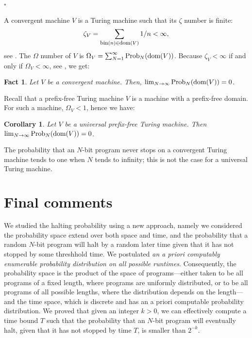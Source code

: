 \documentclass[12pt,twoside,openright]{report}
\newcommand{\QED}{\hfill $\square$}
\newcommand{\dom}{\mbox{\rm dom}}
\newcommand{\fdom}{\mbox{\rm \footnotesize{dom}}}
\newcommand{\fbin}{\mbox{\rm \footnotesize{bin}}}
\newcommand{\Prob}{{\rm Prob}}
\newtheorem{fact}[thm]{Fact}
\newtheorem{cor}[thm]{Corollary}
\begin{document}
\QED

\medskip

A convergent machine $V$ is a Turing machine such that its $\zeta$ number is finite:
$$\zeta_{V} = \sum_{\fbin (n) \in \fdom (V)} 1/n <\infty,$$ see \cite{CSNatural2006}. The $\Omega$ number of $V$ is $\Omega_{V} =\sum_{N=1}^{\infty} \Prob_{N}(\dom (V))$. Because $\zeta_{V} < \infty $ if and only if $\Omega_{V} < \infty$, see \cite{CSNatural2006}, we get:

\medskip

\begin{fact} 
Let $V$ be a convergent machine. Then, $\lim_{N \rightarrow \infty} \Prob_{N}(\dom (V)) =0$. 
\end{fact}

\medskip

Recall that a prefix-free  Turing machine  $V$ is a machine with a prefix-free domain. For such a machine, $\Omega_{V} < 1$, hence we have:

\medskip

\begin{cor} 
Let $V$ be a universal prefix-free Turing machine.  Then $\lim_{N \rightarrow \infty} \Prob_{N}(\dom (V)) =0$. 
\end{cor}

\medskip

The probability that an $N$-bit program never stops on a convergent Turing machine tends to one when $N$ tends to infinity; this is not the case for a universal Turing machine. 
      
\section{Final comments}

We studied the halting probability using a new approach, namely we considered the probability space extend over both space and time, and the probability that a random $N$-bit program will halt by a random later time given that it has not stopped by some threshhold time.  We postulated {\it an a priori computably enumerable probability distribution on all possible runtimes}.  Consequently, the probability space is the product of the space of programs---either taken to be all programs of a fixed length, where programs are uniformly distributed, or to be all programs of all possible lengths, where the distribution depends on the length---and the time space, which is discrete and has an a priori computable probability distribution.   We proved  that given an integer $k>0$, we can effectively compute  a time bound $T$ such that  the probability that an $N$-bit program will eventually halt, given that it has not stopped by time $T$, is smaller than $2^{-k}$.  
\end{document}

